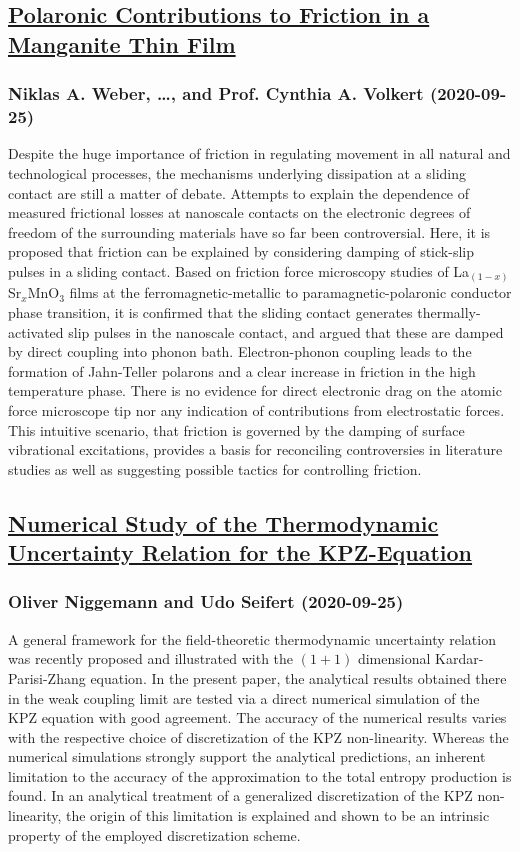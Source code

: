\subsection*{\href{http://arxiv.org/abs/2009.12137v1}{Polaronic Contributions to Friction in a Manganite Thin Film}}
\subsubsection*{Niklas A. Weber, \dots, and Prof. Cynthia A. Volkert (2020-09-25)}
Despite the huge importance of friction in regulating movement in all natural
and technological processes, the mechanisms underlying dissipation at a sliding
contact are still a matter of debate. Attempts to explain the dependence of
measured frictional losses at nanoscale contacts on the electronic degrees of
freedom of the surrounding materials have so far been controversial. Here, it
is proposed that friction can be explained by considering damping of stick-slip
pulses in a sliding contact. Based on friction force microscopy studies of
La$_{(1-x)}$Sr$_x$MnO$_3$ films at the ferromagnetic-metallic to
paramagnetic-polaronic conductor phase transition, it is confirmed that the
sliding contact generates thermally-activated slip pulses in the nanoscale
contact, and argued that these are damped by direct coupling into phonon bath.
Electron-phonon coupling leads to the formation of Jahn-Teller polarons and a
clear increase in friction in the high temperature phase. There is no evidence
for direct electronic drag on the atomic force microscope tip nor any
indication of contributions from electrostatic forces. This intuitive scenario,
that friction is governed by the damping of surface vibrational excitations,
provides a basis for reconciling controversies in literature studies as well as
suggesting possible tactics for controlling friction.

\subsection*{\href{http://arxiv.org/abs/2009.12126v1}{Numerical Study of the Thermodynamic Uncertainty Relation for the  KPZ-Equation}}
\subsubsection*{Oliver Niggemann and Udo Seifert (2020-09-25)}
A general framework for the field-theoretic thermodynamic uncertainty
relation was recently proposed and illustrated with the $(1+1)$ dimensional
Kardar-Parisi-Zhang equation. In the present paper, the analytical results
obtained there in the weak coupling limit are tested via a direct numerical
simulation of the KPZ equation with good agreement. The accuracy of the
numerical results varies with the respective choice of discretization of the
KPZ non-linearity. Whereas the numerical simulations strongly support the
analytical predictions, an inherent limitation to the accuracy of the
approximation to the total entropy production is found. In an analytical
treatment of a generalized discretization of the KPZ non-linearity, the origin
of this limitation is explained and shown to be an intrinsic property of the
employed discretization scheme.

